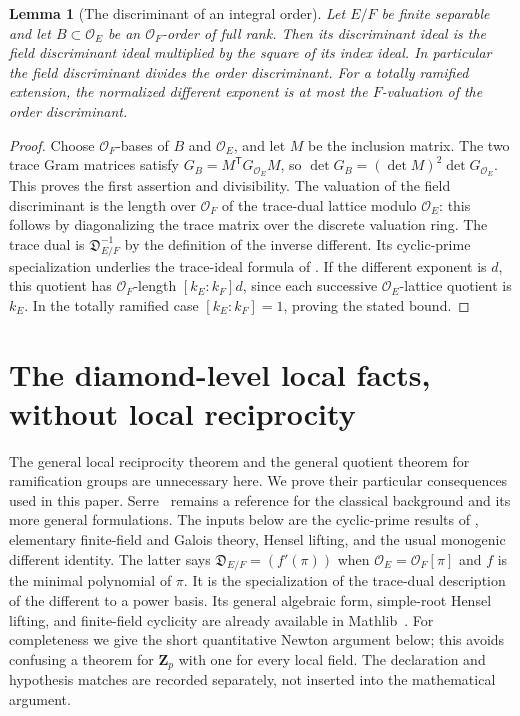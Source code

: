 \documentclass[11pt]{amsart}
\newtheorem{lemma}[theorem]{Lemma}
\theoremstyle{definition}
\theoremstyle{remark}
\newcommand{\OO}{\mathcal O}\newcommand{\pp}{\mathfrak p}\newcommand{\PP}{\mathfrak P}
\begin{document}
\begin{lemma}[The discriminant of an integral order]\label{C:order-discriminant}
Let $E/F$ be finite separable and let $B\subset\OO_E$ be an
$\OO_F$-order of full rank. Then its discriminant ideal is the field
discriminant ideal multiplied by the square of its index ideal.
In particular the field discriminant divides the order discriminant.
For a totally ramified extension, the normalized different exponent
is at most the $F$-valuation of the order discriminant.
\end{lemma}
\begin{proof}
Choose $\OO_F$-bases of $B$ and $\OO_E$, and let $M$ be the
inclusion matrix. The two trace Gram matrices satisfy
$G_B=M^{\mathsf T}G_{\OO_E}M$, so
$\det G_B=(\det M)^2\det G_{\OO_E}$. This proves the first
assertion and divisibility. The valuation of the field discriminant
is the length over $\OO_F$ of the trace-dual lattice modulo
$\OO_E$: this follows by diagonalizing the trace matrix over the
discrete valuation ring. The trace dual is
$\mathfrak D_{E/F}^{-1}$ by the definition of the inverse different.
Its cyclic-prime specialization underlies the trace-ideal formula of
\cite[Theorem~3.7]{Ueda}. If the different exponent is $d$, this
quotient has $\OO_F$-length $[k_E:k_F]d$, since each successive
$\OO_E$-lattice quotient is $k_E$. In the totally ramified case
$[k_E:k_F]=1$, proving the stated bound.
\end{proof}


\section{The diamond-level local facts, without local reciprocity}
\label{app:diamond-foundations}
The general local reciprocity theorem and the general quotient theorem
for ramification groups are unnecessary here. We prove their particular
consequences used in this paper. Serre~\cite[Chapters~III--V, XIII--XIV]{Serre}
remains a reference for the classical background and its more general
formulations. The inputs below are the cyclic-prime results of
\cite[Theorem~3.7, Corollary~3.9, and Proposition~3.3]{Ueda}, elementary
finite-field and Galois theory, Hensel lifting, and the usual monogenic
different identity. The latter says
$\mathfrak D_{E/F}=(f'(\pi))$ when
$\OO_E=\OO_F[\pi]$ and $f$ is the minimal polynomial of $\pi$.
It is the specialization of the trace-dual description of the different
to a power basis. Its general algebraic form, simple-root Hensel lifting,
and finite-field cyclicity are already available in Mathlib~\cite{Mathlib}.
For completeness we give the short quantitative Newton argument below;
this avoids confusing a theorem for $\mathbf Z_p$ with one for every
local field.
The declaration and hypothesis matches are recorded separately, not
inserted into the mathematical argument.
\end{document}

